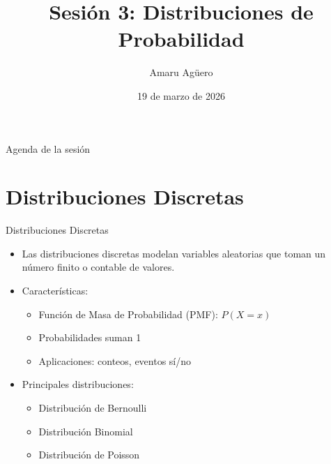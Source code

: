 \documentclass[aspectratio=169,11pt]{beamer}
\institute[CICS — UDD]{Doctorado en Ciencias de la Complejidad Social — CICS, UDD}
\date{19 de marzo de 2026}
\title{Sesión 3: Distribuciones de Probabilidad}
\author[A. Agüero]{Amaru Agüero}
\begin{document}
\frame{\titlepage}

\begin{frame}{Agenda de la sesión}
\tableofcontents[hideallsubsections]
\end{frame}

\section{Distribuciones Discretas}

\begin{frame}{Distribuciones Discretas}
\begin{itemize}
  \item Las distribuciones discretas modelan variables aleatorias que toman un número finito o contable de valores.
  \pause
  \item Características:
  \begin{itemize}
    \item Función de Masa de Probabilidad (PMF): $P(X = x)$
    \item Probabilidades suman 1
    \item Aplicaciones: conteos, eventos sí/no
  \end{itemize}
  \pause
  \item Principales distribuciones:
  \begin{itemize}
    \item Distribución de Bernoulli
    \item Distribución Binomial
    \item Distribución de Poisson
  \end{itemize}
\end{itemize}
\end{frame}
\end{document}
